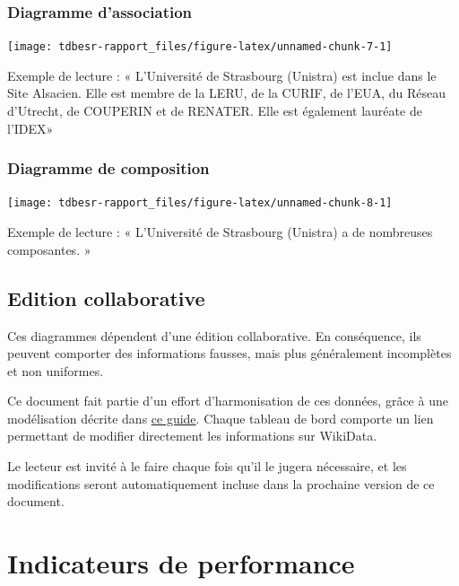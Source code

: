 \documentclass[11pt,french,landscape]{article}
\begin{document}
\begin{multicols}{2}
\hypertarget{diagramme-dassociation}{%
\subsubsection{Diagramme d'association}\label{diagramme-dassociation}}

\begin{center}\texttt{[image: tdbesr-rapport\_files/figure-latex/unnamed-chunk-7-1]} \end{center}

Exemple de lecture : « L'Université de Strasbourg (Unistra) est inclue
dans le Site Alsacien. Elle est membre de la LERU, de la CURIF, de
l'EUA, du Réseau d'Utrecht, de COUPERIN et de RENATER. Elle est
également lauréate de l'IDEX»

\hypertarget{diagramme-de-composition}{%
\subsubsection{Diagramme de
composition}\label{diagramme-de-composition}}

\begin{center}\texttt{[image: tdbesr-rapport\_files/figure-latex/unnamed-chunk-8-1]} \end{center}

Exemple de lecture : « L'Université de Strasbourg (Unistra) a de
nombreuses composantes. »

\hypertarget{edition-collaborative}{%
\subsection{Edition collaborative}\label{edition-collaborative}}

Ces diagrammes dépendent d'une édition collaborative. En conséquence,
ils peuvent comporter des informations fausses, mais plus généralement
incomplètes et non uniformes.

Ce document fait partie d'un effort d'harmonisation de ces données,
grâce à une modélisation décrite dans
\href{https://github.com/cpesr/wikidataESR/blob/master/Rmd/wikidataESR.md}{ce
guide}. Chaque tableau de bord comporte un lien permettant de modifier
directement les informations sur WikiData.

Le lecteur est invité à le faire chaque fois qu'il le jugera nécessaire,
et les modifications seront automatiquement incluse dans la prochaine
version de ce document.

\hypertarget{indicateurs-de-performance}{%
\section{Indicateurs de performance}\label{indicateurs-de-performance}}


\end{multicols}
\end{document}
